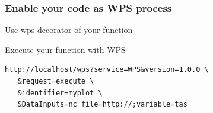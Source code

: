 \documentclass{beamer}
\begin{document}

  \begin{frame}[fragile]
    \frametitle{Enable your code as WPS process}
    \begin{block}{Use wps decorator of your function}
      \tiny
      \lstset{language=python}
      
    \end{block}
    \begin{block}{Execute your function with WPS}
      \begin{verbatim}
http://localhost/wps?service=WPS&version=1.0.0 \
   &request=execute \ 
   &identifier=myplot \
   &DataInputs=nc_file=http://;variable=tas
      \end{verbatim}
    \end{block}
\end{frame}





\end{document}
